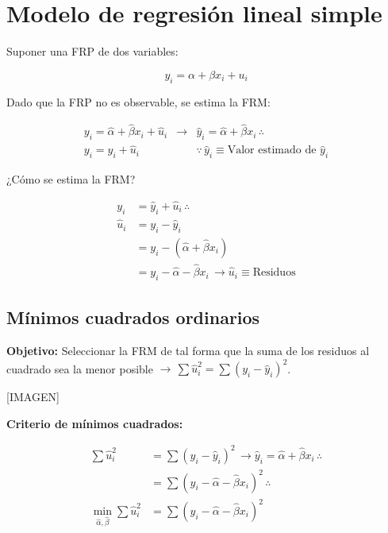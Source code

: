 \documentclass[
]{book}
\begin{document}
\hypertarget{modelo-de-regresiuxf3n-lineal-simple}{%
\chapter{Modelo de regresión lineal simple}\label{modelo-de-regresiuxf3n-lineal-simple}}

Suponer una FRP de dos variables:

\[
y_i = \alpha + \beta x_i + u_i
\]

Dado que la FRP no es observable, se estima la FRM:

\[
\begin{array}{ccc}
y_i = \hat \alpha + \hat \beta x_i + \hat u_i & \rightarrow & \hat y_i = \hat \alpha + \hat \beta x_i \, \therefore \\
y_i = \hat y_i + \hat u_i & & \because \, \hat y_i \equiv \text{Valor estimado de } \hat y_i
\end{array}
\]

¿Cómo se estima la FRM?

\[
\begin{aligned}
y_i &= \hat y_i + \hat u_i \, \therefore \\
\hat u_i &= y_i - \hat y_i \\
&= y_i - (\hat \alpha + \hat \beta x_i) \\
&= y_i - \hat \alpha - \hat \beta x_i \, \rightarrow \hat u_i \equiv \text{Residuos}
\end{aligned}
\]

\hypertarget{muxednimos-cuadrados-ordinarios}{%
\section{Mínimos cuadrados ordinarios}\label{muxednimos-cuadrados-ordinarios}}

\textbf{Objetivo:} Seleccionar la FRM de tal forma que la suma de los residuos al cuadrado sea la menor posible \(\rightarrow \, \sum \hat u_i^2 = \sum (y_i - \hat y_i)^2\).

{[}IMAGEN{]}

\textbf{Criterio de mínimos cuadrados:}

\[
\begin{aligned}
\sum \hat u_i^2 &= \sum (y_i - \hat y_i)^2 \, \rightarrow \hat y_i = \hat \alpha + \hat \beta x_i \, \therefore \\
&= \sum(y_i - \hat \alpha - \hat \beta x_i)^2 \, \therefore \\
 \min_{\hat \alpha, \hat \beta} \sum \hat u_i^2 &= \sum(y_i - \hat \alpha - \hat \beta x_i)^2
\end{aligned}
\]
\end{document}
